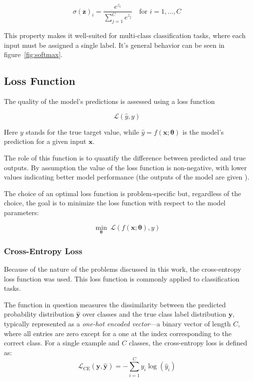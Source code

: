 \documentclass{pracalicmgr}
\begin{document}
\[
\sigma(\mathbf{z})_i = \frac{e^{z_i}}{\sum_{j=1}^{C} e^{z_j}} \quad \text{for } i = 1, \dots, C
\]

This property makes it well-suited for multi-class classification tasks, where each input must be assigned a single label. It's general behavior can be seen in figure~\ref{fig:softmax}.

\subsection{Loss Function}

The quality of the model's predictions is assessed using a loss function 

\[
\mathcal{L}(\hat{y}, y)
\]

Here $y$ stands for the true target value, while \( \hat{y} = f(\mathbf{x}; \boldsymbol{\theta}) \) is the model's prediction for a given input \( \mathbf{x} \).

The role of this function is to quantify the difference between predicted and true outputs. By assumption the value of the loss function is non-negative, with lower values indicating better model performance (the outputs of the model are given ).

The choice of an optimal loss function is problem-specific but, regardless of the choice, the goal is to minimize the loss function with respect to the model parameters:

\[
\min_{\boldsymbol{\theta}} \ \mathcal{L}(f(\mathbf{x}; \boldsymbol{\theta}), y)
\]

\subsubsection{Cross-Entropy Loss}

Because of the nature of the problems discussed in this work, the cross-entropy loss function was used. This loss function is commonly applied to classification tasks.

The function in question measures the dissimilarity between the predicted probability distribution \( \hat{\mathbf{y}} \) over classes and the true class label distribution \( \mathbf{y} \), typically represented as a \textit{one-hot encoded vector}—a binary vector of length \( C \), where all entries are zero except for a one at the index corresponding to the correct class. For a single example and \( C \) classes, the cross-entropy loss is defined as:
\[
\mathcal{L}_{\text{CE}}(\mathbf{y}, \hat{\mathbf{y}}) = -\sum_{i=1}^{C} y_i \log(\hat{y}_i)
\]
\end{document}
